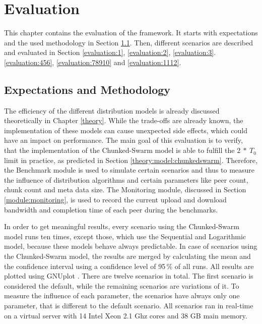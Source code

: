 
\chapter{Evaluation}
\label{evaluation}

This chapter contains the evaluation of the framework. It starts with expectations and the used methodology in Section \ref{evaluation:expectations}. Then, different scenarios are described and evaluated in Section \ref{evaluation:1}, \ref{evaluation:2}, \ref{evaluation:3}. \ref{evaluation:456}, \ref{evaluation:78910} and \ref{evaluation:1112}.

\section{Expectations and Methodology}
\label{evaluation:expectations}

The efficiency of the different distribution models is already discussed theoretically in Chapter \ref{theory}. While the trade-offs are already known, the implementation of these models can cause unexpected side effects, which could have an impact on performance. The main goal of this evaluation is to verify, that the implementation of the Chunked-Swarm model is able to fulfill the $2\:*\:T_0$ limit in practice, as predicted in Section \ref{theory:model:chunkedswarm}. Therefore, the Benchmark module is used to simulate certain scenarios and thus to measure the influence of distribution algorithms and certain parameters like peer count, chunk count and meta data size. The Monitoring module, discussed in Section \ref{module:monitoring}, is used to record the current upload and download bandwidth and completion time of each peer during the benchmarks.

In order to get meaningful results, every scenario using the Chunked-Swarm model runs ten times, except those, which use the Sequential and Logarithmic model, because these models behave always predictable. In case of scenarios using the Chunked-Swarm model, the results are merged by calculating the mean and the confidence interval using a confidence level of 95\,\% of all runs. All results are plotted using GNUplot \cite{Misc:GNUplot}. There are twelve scenarios in total. The first scenario is considered the default, while the remaining scenarios are variations of it. To measure the influence of each parameter, the scenarios have always only one parameter, that is different to the default scenario. All scenarios ran in real-time on a virtual server with 14 Intel Xeon 2.1 Ghz cores and 38 GB main memory.

